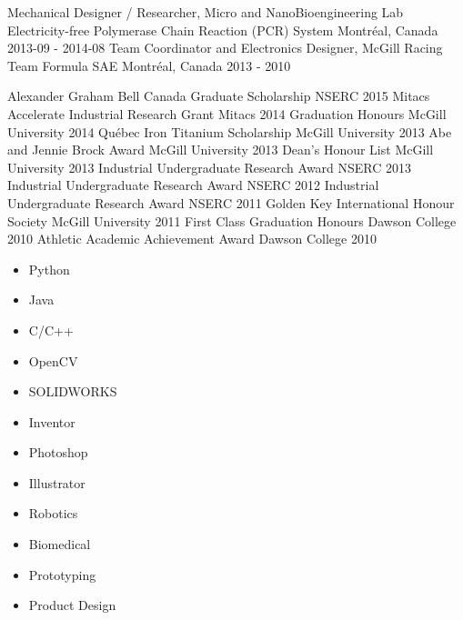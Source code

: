 \documentclass[11pt, letterpaper]{awesome-cv}
\begin{document}
\begin{cventries}
  \cventry
  {Mechanical Designer / Researcher, Micro and NanoBioengineering Lab}
  {Electricity-free Polymerase Chain Reaction (PCR) System}
  {Montréal, Canada}
  {2013-09 - 2014-08}
  {}
  \cventry
  {Team Coordinator and Electronics Designer, McGill Racing Team}
  {Formula SAE}
  {Montréal, Canada}
  {2013 - 2010}
  {}
  \end{cventries}

\begin{cvhonors}
  \cvhonor
  {Alexander Graham Bell Canada Graduate Scholarship}
  {NSERC}
  {}
  {2015}
  {}
  \cvhonor
  {Mitacs Accelerate Industrial Research Grant}
  {Mitacs}
  {}
  {2014}
  {}
  \cvhonor
  {Graduation Honours}
  {McGill University}
  {}
  {2014}
  {}
  \cvhonor
  {Québec Iron Titanium Scholarship}
  {McGill University}
  {}
  {2013}
  {}
  \cvhonor
  {Abe and Jennie Brock Award}
  {McGill University}
  {}
  {2013}
  {}
  \cvhonor
  {Dean's Honour List}
  {McGill University}
  {}
  {2013}
  {}
  \cvhonor
  {Industrial Undergraduate Research Award}
  {NSERC}
  {}
  {2013}
  {}
  \cvhonor
  {Industrial Undergraduate Research Award}
  {NSERC}
  {}
  {2012}
  {}
  \cvhonor
  {Industrial Undergraduate Research Award}
  {NSERC}
  {}
  {2011}
  {}
  \cvhonor
  {Golden Key International Honour Society}
  {McGill University}
  {}
  {2011}
  {}
  \cvhonor
  {First Class Graduation Honours}
  {Dawson College}
  {}
  {2010}
  {}
  \cvhonor
  {Athletic Academic Achievement Award}
  {Dawson College}
  {}
  {2010}
  {}
  \end{cvhonors}

\begin{multicols}{3}
\begin{itemize}
\item {Python}
    \item {Java}
    \item {C/C++}
    \item {OpenCV}
    \item {SOLIDWORKS}
    \item {Inventor}
    \item {Photoshop}
    \item {Illustrator}
    \item {Robotics}
    \item {Biomedical}
    \item {Prototyping}
    \item {Product Design}
    \end{itemize}
\end{multicols}
\end{document}
